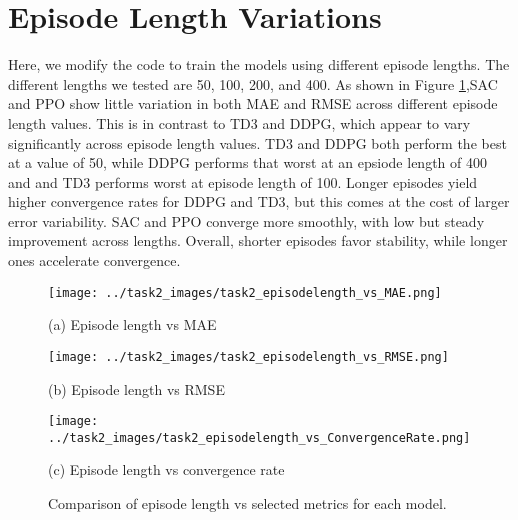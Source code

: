 \documentclass[11pt]{article}
\begin{document}
\section{Episode Length Variations}

Here, we modify the code to train the models using different episode lengths. The different lengths we tested are 50, 100, 200, and 400. As shown in Figure \ref{fig:eps_vs_metrics},SAC and PPO show little variation in both MAE and RMSE across different episode length values. This is in contrast to TD3 and DDPG, which appear to vary significantly across episode length values. TD3 and DDPG both perform the best at a value of 50, while DDPG performs that worst at an epsiode length of 400 and and TD3 performs worst at episode length of 100. Longer episodes yield higher convergence rates for DDPG and TD3, but this comes at the cost of larger error variability. SAC and PPO converge more smoothly, with low but steady improvement across lengths. Overall, shorter episodes favor stability, while longer ones accelerate convergence.



\begin{figure}[h!]
  \centering
  \begin{minipage}[b]{0.49\textwidth}
    \texttt{[image: ../task2\_images/task2\_episodelength\_vs\_MAE.png]}
    \caption*{(a) Episode length vs MAE}
  \end{minipage}
  \hfill
  \begin{minipage}[b]{0.49\textwidth}
    \texttt{[image: ../task2\_images/task2\_episodelength\_vs\_RMSE.png]}
    \caption*{(b) Episode length vs RMSE}
  \end{minipage}
  \hfill
  \begin{minipage}[b]{0.49\textwidth}
    \texttt{[image: ../task2\_images/task2\_episodelength\_vs\_ConvergenceRate.png]}
    \caption*{(c) Episode length vs convergence rate}
  \end{minipage}
  \caption{Comparison of episode length vs selected metrics for each model.}
  \label{fig:eps_vs_metrics}
\end{figure}
\end{document}
